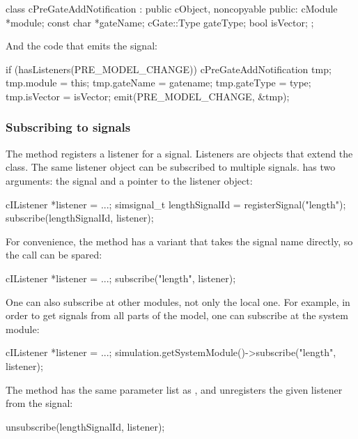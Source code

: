 \begin{note}
\begin{note}
\begin{cpp}
class cPreGateAddNotification : public cObject, noncopyable
{
  public:
    cModule *module;
    const char *gateName;
    cGate::Type gateType;
    bool isVector;
};
\end{cpp}

And the code that emits the signal:

\begin{cpp}
if (hasListeners(PRE_MODEL_CHANGE))
{
    cPreGateAddNotification tmp;
    tmp.module = this;
    tmp.gateName = gatename;
    tmp.gateType = type;
    tmp.isVector = isVector;
    emit(PRE_MODEL_CHANGE, &tmp);
}
\end{cpp}


\subsubsection{Subscribing to signals}

The  method registers a listener for a signal.
Listeners are objects that extend the  class.
The same listener object can be subscribed to multiple signals.
 has two arguments: the signal and a pointer to
the listener object:

\begin{cpp}
cIListener *listener = ...;
simsignal_t lengthSignalId = registerSignal("length");
subscribe(lengthSignalId, listener);
\end{cpp}

For convenience, the  method has a variant
that takes the signal name directly, so the 
call can be spared:

\begin{cpp}
cIListener *listener = ...;
subscribe("length", listener);
\end{cpp}

One can also subscribe at other modules, not only the local one.
For example, in order to get signals from all parts of the model,
one can subscribe at the system module:

\begin{cpp}
cIListener *listener = ...;
simulation.getSystemModule()->subscribe("length", listener);
\end{cpp}

The  method has the same parameter list
as , and unregisters the given listener
from the signal:

\begin{cpp}
unsubscribe(lengthSignalId, listener);
\end{cpp}


\end{note}
\end{note}
